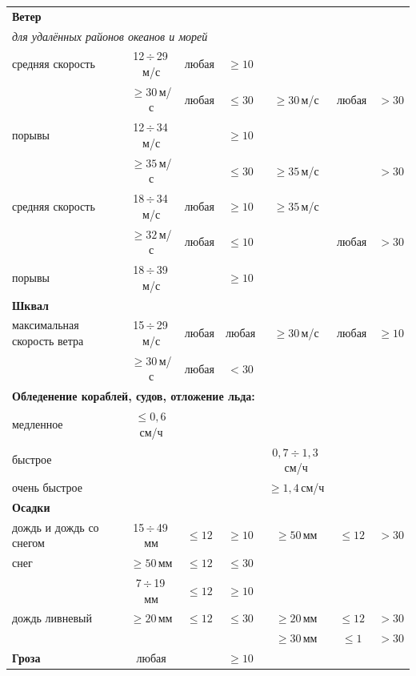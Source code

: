 \documentclass[a4paper, 12pt, twoside, final, book, russian, fittopage, cyremdash, openright]{ncc}
\newcommand{\mps}{\,м/с\xspace}
\newcommand{\otdo}{\,\ensuremath{\div}\,}
\renewcommand{\le}{\leqslant}
\renewcommand{\ge}{\geqslant}
\begin{document}
\begin{longtable}{l|c|c|c|c|c|c}
  \multicolumn{7}{l}{\textbf{Ветер}} \\*
  \multicolumn{7}{l}{\textit{для удалённых районов океанов и морей}} \\*
  средняя скорость & 12\otdo29\mps & любая & $\ge10$  &               &       &        \\*
  {}               & $\ge30$\mps   & любая & $\le30$  & $\ge30$\mps   & любая & $>30$  \\
  порывы           & 12\otdo34\mps &       & $\ge10$  &               &       &        \\*
  {}               & $\ge35$\mps   &       & $\le30$  & $\ge35$\mps   &       & $>30$  \\
  \midrule
  средняя скорость & 18\otdo34\mps & любая & $\ge10$  & $\ge35$\mps   &       &        \\*
  {}               & $\ge32$\mps   & любая & $\le10$  &               & любая & $>30$  \\
  порывы           & 18\otdo39\mps &       & $\ge10$  &               &       &        \\
  \midrule

  \multicolumn{7}{l}{\textbf{Шквал}} \\*
  максимальная скорость ветра
  {}               & 15\otdo29\mps & любая & любая    & $\ge30$\mps   & любая &$\ge10$ \\*
  {}               & $\ge30$\mps   & любая & $<30$    &               &       &        \\ 
  \midrule

  \multicolumn{7}{l}{\textbf{Обледенение кораблей, судов, отложение льда:}} \\*
  медленное        & $\le0,6$\,см/ч &      &          &               &       &         \\
  \midrule
  быстрое          &               &       &          & $0,7\div1,3$\,см/ч &  &         \\
  \midrule
  очень быстрое    &               &       &          & $\ge1,4$\,см/ч &      &         \\
  \midrule

  \multicolumn{7}{l}{\textbf{Осадки}} \\*
  дождь и дождь со снегом & 15\otdo49\,мм & $\le12$ & $\ge10$ & $\ge50$\,мм & $\le12$ & $>30$ \\
  \midrule
  снег             & $\ge50$\,мм   & $\le12$ & $\le30$ &               &      &         \\*
  {}               & 7\otdo19\,мм  & $\le12$ & $\ge10$ &               &      &         \\
  \midrule
  дождь ливневый   & $\ge20$\,мм   & $\le12$ & $\le30$ & $\ge20$\,мм  & $\le12$ & $>30$ \\*
  {}               &               &         &         & $\ge30$\,мм   & $\le1$ & $>30$ \\
  \midrule
  \textbf{Гроза}   & любая         &         & $\ge10$ &               &      &         \\
  \midrule


\end{longtable}
\end{document}
